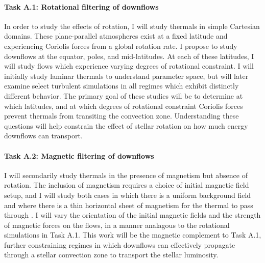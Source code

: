 \documentclass[11pt, preprint]{aastex}
\begin{document}
\vspace{-0.5cm}
\paragraph{Task A.1: Rotational filtering of downflows}
\label{sct:taskA1}
In order to study the effects of rotation, I will study thermals in simple Cartesian domains.
These plane-parallel atmospheres exist at a fixed latitude and experiencing Coriolis forces from a global rotation rate.
I propose to study downflows at the equator, poles, and mid-latitudes.
At each of these latitudes, I will study flows which experience varying degrees of rotational constraint.
I will initially study laminar thermals to understand parameter space, but will later examine select turbulent simulations in all regimes which exhibit distinctly different behavior.
The primary goal of these studies will be to determine at which latitudes, and at which degrees of rotational constraint Coriolis forces prevent thermals from transiting the convection zone.
Understanding these questions will help constrain the effect of stellar rotation on how much energy downflows can transport.

\vspace{-0.5cm}
\paragraph{Task A.2: Magnetic filtering of downflows}
\label{sct:taskA2}
I will secondarily study thermals in the presence of magnetism but absence of rotation.
The inclusion of magnetism requires a choice of initial magnetic field setup, and I will study both cases in which there is a uniform background field and where there is a thin horizontal sheet of magnetism for the thermal to pass through \citep[as in][]{tobias&all1998}.
I will vary the orientation of the initial magnetic fields and the strength of magnetic forces on the flows, in a manner analagous to the rotational simulations in Task A.1.
This work will be the magnetic complement to Task A.1, further constraining regimes in which downflows can effectively propagate through a stellar convection zone to transport the stellar luminosity.


\vspace{-0.8cm}
\end{document}
